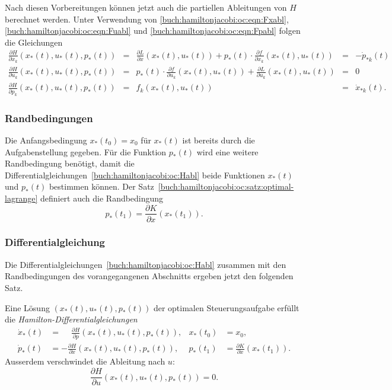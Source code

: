 Nach diesen Vorbereitungen können jetzt auch die partiellen Ableitungen
von $H$ berechnet werden.
Unter Verwendung von 
\eqref{buch:hamiltonjacobi:oc:eqn:Fxabl},
\eqref{buch:hamiltonjacobi:oc:eqn:Fuabl}
und
\eqref{buch:hamiltonjacobi:oc:eqn:Fpabl}
folgen die Gleichungen
\begin{equation}
\renewcommand{\arraycolsep}{2pt}
\renewcommand{\arraystretch}{2.0}
\begin{array}{rclcl}
\displaystyle
\frac{\partial H}{\partial x_k}(x_*(t),u_*(t),p_*(t))
&=&
\displaystyle
\frac{\partial L}{\partial x}(x_*(t),u_*(t))
+
p_*(t)\cdot\frac{\partial f}{\partial x_k}(x_*(t),u_*(t))
&=&-\dot{p}_{*k}(t)
\\
\displaystyle
\frac{\partial H}{\partial u_k}(x_*(t),u_*(t),p_*(t))
&=&
\displaystyle
p_*(t)\cdot
\frac{\partial f}{\partial u_k}(x_*(t),u_*(t))
+
\frac{\partial L}{\partial u_k}(x_*(t),u_*(t))
&=&0
\\
\displaystyle
\frac{\partial H}{\partial p_k}(x_*(t),u_*(t),p_*(t))
&=&
f_k(x_*(t),u_*(t))
&=&
\dot{x}_{*k}(t).
\end{array}
\label{buch:hamiltonjacobi:oc:Habl}
\end{equation}

%
%
\subsubsection{Randbedingungen}
Die Anfangsbedingung $x_*(t_0)=x_0$ für $x_*(t)$ ist bereits durch
die Aufgabenstellung gegeben.
Für die Funktion $p_*(t)$ wird eine weitere Randbedingung benötigt,
damit die Differentialgleichungen~\eqref{buch:hamiltonjacobi:oc:Habl}
beide Funktionen $x_*(t)$ und $p_*(t)$ bestimmen können.
Der Satz~\ref{buch:hamiltonjacobi:oc:satz:optimal-lagrange}
definiert auch die Randbedingung
\[
p_*(t_1)
=
\frac{\partial K}{\partial x}(x_*(t_1)).
\]

%
%
\subsubsection{Differentialgleichung}
Die Differentialgleichungen~\eqref{buch:hamiltonjacobi:oc:Habl} zusammen
mit den Randbedingungen des vorangegangenen Abschnitts ergeben jetzt
den folgenden Satz.

\begin{satz}
\label{buch:hamiltonjacobi:oc:satz:hamilton-gleichungen}
%
Eine Lösung $(x_*(t),u_*(t),p_*(t))$ der optimalen Steuerungsaufgabe
erfüllt die {\em Hamilton-Differentialgleichungen}
\begin{align*}
\dot{x}_*(t)
&=
\phantom{-}
\frac{\partial H}{\partial p}(x_*(t),u_*(t),p_*(t)),
&
x_*(t_0)
&=
x_0,
\\
\dot{p}_*(t)
&=
-
\frac{\partial H}{\partial x}(x_*(t),u_*(t),p_*(t)),
&
p_*(t_1)
&=
\frac{\partial K}{\partial x}(x_*(t_1)).
\end{align*}
Ausserdem verschwindet die Ableitung nach $u$:
\begin{equation}
\frac{\partial H}{\partial u}(x_*(t),u_*(t),p_*(t))=0.
\label{buch:hamiltonjacobi:oc:eqn:ablHu0}
\end{equation}
\end{satz}

